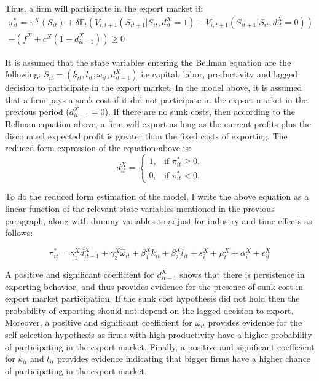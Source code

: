 \documentclass[12pt]{article}
\begin{document}
 Thus, a firm will participate in the export market if:
\begin{equation}
\begin{aligned}
\pi_{it}^{*} = \pi^{X}(S_{it})  +
\delta \mathbb{E}_{t}(V_{i,t+1}(S_{it+1}|S_{it},d_{it}^{X}=1) -
V_{i,t+1}(S_{it+1}|S_{it},d_{it}^{X}=0))\\ 
-  (f^{X} +
c^{X}(1-d_{it-1}^{X})) \geq 0
\end{aligned}
\end{equation}

It is assumed that the state variables entering the Bellman equation
are the following: $S_{it}= (k_{it}, l_{it}, \omega_{it},
d_{it-1}^{X})$ i.e capital, labor, productivity and lagged decision to
participate in the export market. In the model above, it is assumed
that a firm pays a sunk cost if it did not participate in the export
market in the previous period  ($d_{it-1}^{X} = 0$).  If there are no sunk costs, then
according to the Bellman equation above, a firm will export as long as
the current profits plus the discounted expected profit is greater
than the fixed costs of exporting. 
The reduced form expression of the equation above is: 
\begin{equation}
  d_{it}^{X}=\begin{cases}
   1 , & \text{if $\pi_{it}^{*} \geq 0$}.\\
   0 , & \text{if $\pi_{it}^{*}<  0$}.
  \end{cases}
\end{equation}

To do the reduced form estimation of the model, I write the above equation as a linear
function of the relevant state variables mentioned in the previous
paragraph, along with dummy variables to
adjust for industry and time effects as follows:

\begin{equation}
\label{eq:export}
  \pi_{it}^{*}=   \gamma_{1}^{X} d_{it-1}^{X} + 
\gamma_{3}^{X} \hat{\omega}_{it}  + \beta_{1}^{X}k_{it}  +\beta_{2}^{X}l_{it}+
s_{i}^{X} + \mu_{t}^{X}  + \alpha_{i}^{X}+ \epsilon_{it}^{X}
\end{equation}


A positive and significant coefficient for $d_{it-1}^{X}$ shows that there is
persistence in exporting behavior, and thus provides
evidence for the presence of sunk cost in export market participation.
If the sunk cost hypothesis did not hold then the probability of exporting
should not depend on the lagged decision to export. Moreover, a positive and significant
coefficient for $\omega_{it}$  provides evidence for the
self-selection hypothesis as firms with high
productivity have a higher probability of participating  in the export
market. Finally, a positive and significant coefficient for $k_{it}$
and $l_{it}$ provides evidence indicating that bigger firms have a
higher chance of participating in the export market. 
\end{document}
